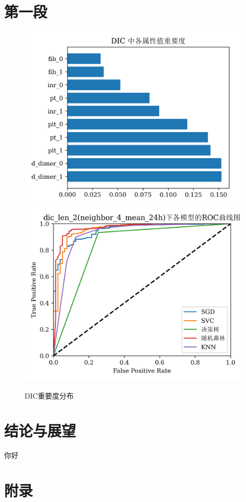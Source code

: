 \documentclass[12pt, a4paper, oneside]{ctexart}
\numberwithin{equation}{section}  %
\begin{document}
\section{第一段}
\begin{figure}[htbp]
    \hspace{-2.5cm}
    \subfigure  %
    {
        \begin{minipage}[b]{.62\linewidth}
            \centering
            \includegraphics[scale=0.8]{dic_attributes_rank.png}
        \end{minipage}
    }
    \subfigure
    {
        \begin{minipage}[b]{.2\linewidth}
            \centering
            \includegraphics[scale=0.8]{dic_len_2(neighbor_4_mean_24h)_roc_curves.png}
        \end{minipage}
    }
\end{figure}
\begin{figure}[htbp]
    \centering
    \caption{DIC重要度分布}
\end{figure}
\section{结论与展望}
\clearpage
\begin{thebibliography}{99}
     你好
\end{thebibliography}
\clearpage
\appendix
\section{附录}
\end{document}
